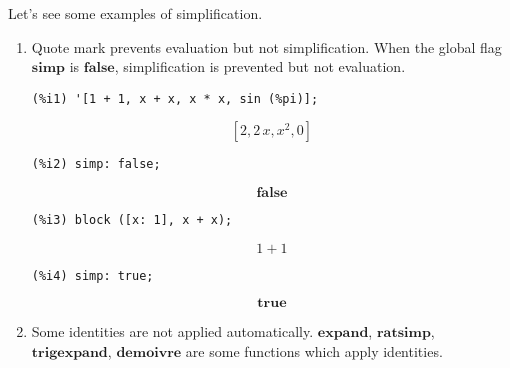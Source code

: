\documentclass[12pt,leqno]{article}
\begin{document}
Let's see some examples of simplification.

\begin{enumerate}

\item Quote mark prevents evaluation but not simplification.
When the global flag $\mathbf{simp}$ is $\mathbf{false}$,
simplification is prevented but not evaluation.

\begin{verbatim}
(%i1) '[1 + 1, x + x, x * x, sin (%pi)];
\end{verbatim}
\begin{equation}
\left[ 2 , 2\,x , x^2 , 0 \right] \tag{\%o1}
\label{eq:doc-group1-code21-1-1}
\end{equation}
\begin{verbatim}
(%i2) simp: false;
\end{verbatim}
\begin{equation}
\mathbf{false}\tag{\%o2}
\label{eq:doc-group1-code21-2-1}
\end{equation}
\begin{verbatim}
(%i3) block ([x: 1], x + x);
\end{verbatim}
\begin{equation}
1+1\tag{\%o3}
\label{eq:doc-group1-code21-3-1}
\end{equation}
\begin{verbatim}
(%i4) simp: true;
\end{verbatim}
\begin{equation}
\mathbf{true}\tag{\%o4}
\label{eq:doc-group1-code21-4-1}
\end{equation}


\item Some identities are not applied automatically.
$\mathbf{expand}$, $\mathbf{ratsimp}$, $\mathbf{trigexpand}$, $\mathbf{demoivre}$
are some functions which apply identities.


\end{enumerate}
\end{document}
